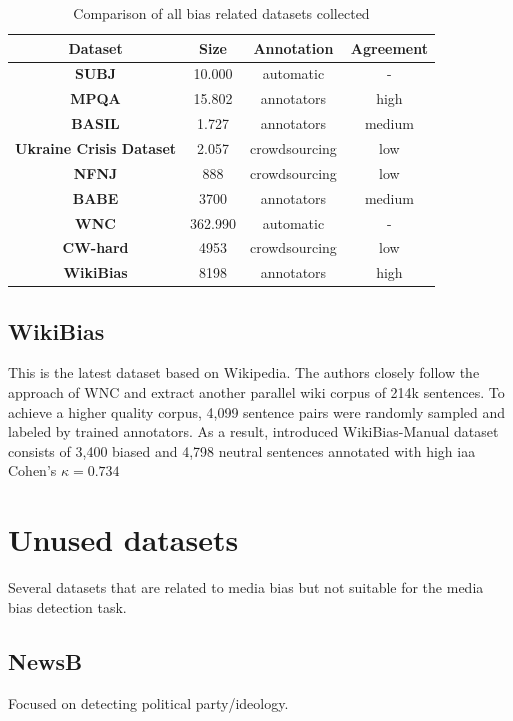 \begin{table}
\begin{ctucolortab}
\begin{tabular}{c|c|c|c}
 \textbf{Dataset} & \textbf{Size} & \textbf{Annotation} & \textbf{Agreement}\\
 \hline
 \textbf{SUBJ} & 10.000 & automatic & -\\ 
 \hline
 \textbf{MPQA} & 15.802 & annotators & high \\
 \hline
 \textbf{BASIL} &  1.727 & annotators & medium \\ 
 \hline
 \textbf{Ukraine Crisis Dataset} & 2.057 & crowdsourcing & low \\ 
 \hline
 \textbf{NFNJ} & 888 & crowdsourcing & low \\
 \hline
 \textbf{BABE} & 3700 & annotators & medium \\
 \hline 
 \textbf{WNC} & 362.990 & automatic & - \\
 \hline
 \textbf{CW-hard} & 4953 & crowdsourcing & low \\
 \hline 
 \textbf{WikiBias} & 8198 & annotators & high \\
 \hline
\end{tabular}
\end{ctucolortab}
\caption{Comparison of all bias related datasets collected}
\label{table:1}
\end{table}


\subsection{WikiBias}
This is the latest dataset based on Wikipedia. The authors closely follow the approach of WNC \cite{pryzant2020automatically} and extract another parallel wiki corpus of 214k sentences.
To achieve a higher quality corpus, 4,099 sentence pairs were randomly sampled and labeled by trained annotators. As a result, introduced WikiBias-Manual dataset consists of 3,400 biased and 4,798 neutral sentences annotated with high \gls{iaa} Cohen's $\kappa = 0.734$




\section{Unused datasets}
Several datasets that are related to media bias but not suitable for the media bias detection task.



\subsection{NewsB}
Focused on detecting political party/ideology.




